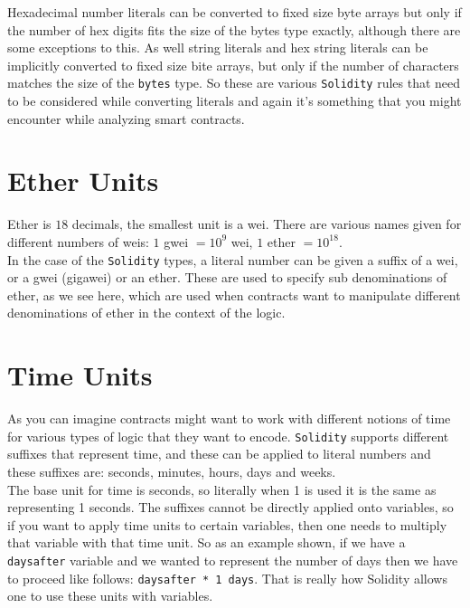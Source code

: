 Hexadecimal number literals can be converted to fixed size byte arrays but only if the number of hex digits fits the size of the bytes type exactly, although there are some exceptions to this. As well string literals and hex string literals can be implicitly converted to fixed size bite arrays, but only if the number of characters matches the size of the \texttt{bytes} type. So these are various \texttt{Solidity} rules that need to be considered while converting literals and again it's something that you might encounter while analyzing smart contracts.

\section{Ether Units}
Ether is $18$ decimals, the smallest unit is a wei. There are various names given for different numbers of weis: $1$ gwei $= 10^9$ wei, $1$ ether $= 10^{18}$.\\

In the case of the \texttt{Solidity} types, a literal number can be given a suffix of a wei, or a gwei (gigawei) or an ether. These are used to specify sub denominations of ether, as we see here, which are used when contracts want to manipulate different denominations of ether in the context of the logic.

\section{Time Units}
As you can imagine contracts might want to work with different notions of time for various types of logic that they want to encode. \texttt{Solidity} supports different suffixes that represent time, and these can be applied to literal numbers and these suffixes are: seconds, minutes, hours, days and weeks.\\

The base unit for time is seconds, so literally when 1 is used it is the same as representing 1 seconds. The suffixes cannot be directly applied onto variables, so if you want to apply time units to certain variables, then one needs to multiply that variable with that time unit. So as an example shown, if we have a \texttt{daysafter} variable and we wanted to represent the number of days then we have to proceed like follows: \texttt{daysafter * 1 days}. That is really how Solidity allows one to use these units with variables.

